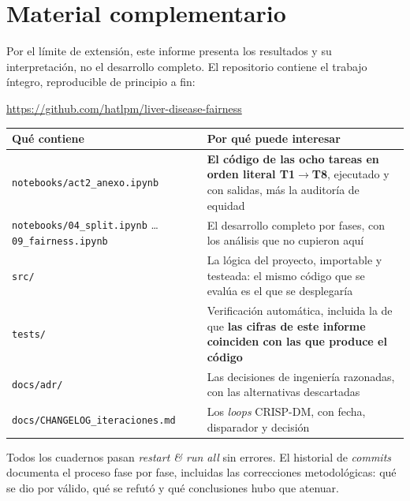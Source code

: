 \documentclass[10pt,a4paper]{article}
\begin{document}
\section*{Material complementario}

Por el límite de extensión, este informe presenta los resultados y su interpretación, no el desarrollo completo. El repositorio contiene el trabajo íntegro, reproducible de principio a fin:

\begin{center}
\url{https://github.com/hatlpm/liver-disease-fairness}
\end{center}

\begin{table}[H]
\footnotesize
\begin{tabularx}{\textwidth}{@{}l X@{}}
\toprule
\textbf{Qué contiene} & \textbf{Por qué puede interesar} \\
\midrule
\texttt{notebooks/act2\_anexo.ipynb} & \textbf{El código de las ocho tareas en orden literal T1$\rightarrow$T8}, ejecutado y con salidas, más la auditoría de equidad \\
\texttt{notebooks/04\_split.ipynb} \dots \texttt{09\_fairness.ipynb} & El desarrollo completo por fases, con los análisis que no cupieron aquí \\
\texttt{src/} & La lógica del proyecto, importable y testeada: el mismo código que se evalúa es el que se desplegaría \\
\texttt{tests/} & Verificación automática, incluida la de que \textbf{las cifras de este informe coinciden con las que produce el código} \\
\texttt{docs/adr/} & Las decisiones de ingeniería razonadas, con las alternativas descartadas \\
\texttt{docs/CHANGELOG\_iteraciones.md} & Los \textit{loops} CRISP-DM, con fecha, disparador y decisión \\
\bottomrule
\end{tabularx}
\end{table}

Todos los cuadernos pasan \textit{restart \& run all} sin errores. El historial de \textit{commits} documenta el proceso fase por fase, incluidas las correcciones metodológicas: qué se dio por válido, qué se refutó y qué conclusiones hubo que atenuar.
\end{document}
